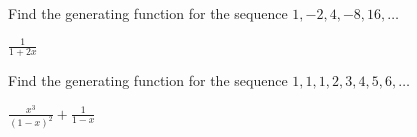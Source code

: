 \begin{squestions}

	\begin{answer}
	\end{answer}





\question Find the generating function for the sequence $1, -2, 4, -8, 16, \ldots$

	\begin{answer}
		$\frac{1}{1+2x}$ 
	\end{answer}




\question Find the generating function for the sequence $1, 1, 1, 2, 3, 4, 5, 6, \ldots$

	\begin{answer}
		$\frac{x^3}{(1-x)^2} + \frac{1}{1-x}$
	\end{answer}






\end{squestions}
